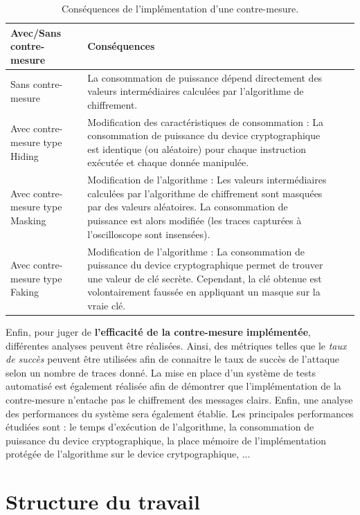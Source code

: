\documentclass[oneside]{book}
\begin{document}
\begin{table}
	\centering
	\begin{tabular}{|l|m{9cm}|l|m{3cm}|}
    		\hline
   		 Avec/Sans contre-mesure & Conséquences \\ \hline
    		Sans contre-mesure & La consommation de puissance dépend directement des valeurs intermédiaires calculées par l’algorithme de chiffrement. \\ \hline
		Avec contre-mesure type Hiding & Modification des caractéristiques de consommation : La consommation de puissance du device cryptographique est identique (ou aléatoire) pour chaque instruction exécutée et chaque donnée manipulée. \\ \hline
    		Avec contre-mesure type Masking & Modification de l’algorithme : Les valeurs intermédiaires calculées par l’algorithme de chiffrement sont masquées par des valeurs aléatoires. La consommation de puissance est alors modifiée (les traces capturées à l’oscilloscope sont insensées). \\ \hline
		Avec contre-mesure type Faking & Modification de l’algorithme : La consommation de puissance du device cryptographique permet de trouver une valeur de clé secrète. Cependant, la clé obtenue est volontairement faussée en appliquant un masque sur la vraie clé. \\ \hline
 	\end{tabular}
 	\caption{Conséquences de l'implémentation d'une contre-mesure.}
 	\label{fig:intro2}
\end{table}

\newpage
Enfin, pour juger de \textbf{l'efficacité de la contre-mesure implémentée}, différentes analyses peuvent être réalisées. Ainsi, des métriques telles que le \textit{taux de succès} peuvent être utilisées afin de connaitre le taux de succès de l'attaque selon un nombre de traces donné. La mise en place d'un système de tests automatisé est également réalisée afin de démontrer que l'implémentation de la contre-mesure n'entache pas le chiffrement des messages clairs. Enfin, une analyse des performances du système sera également établie. Les principales performances étudiées sont : le temps d'exécution de l'algorithme, la consommation de puissance du device cryptographique, la place mémoire de l'implémentation protégée de l'algorithme sur le device crytpographique, ...

\section{Structure du travail}
\end{document}
